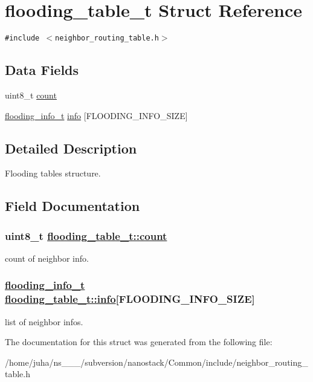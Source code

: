 \hypertarget{structflooding__table__t}{
\section{flooding\_\-table\_\-t Struct Reference}
\label{structflooding__table__t}
}
{\tt \#include $<$neighbor\_\-routing\_\-table.h$>$}

\subsection*{Data Fields}
\begin{CompactItemize}
\item 
uint8\_\-t \hyperlink{structflooding__table__t_cb13efcc138f8c2ec9bfc7f79e404ec1}{count}
\item 
\hyperlink{structflooding__info__t}{flooding\_\-info\_\-t} \hyperlink{structflooding__table__t_19b31cdd8cfa635644fefbfc84881f91}{info} \mbox{[}FLOODING\_\-INFO\_\-SIZE\mbox{]}
\end{CompactItemize}


\subsection{Detailed Description}
Flooding tables structure. 



\subsection{Field Documentation}
\hypertarget{structflooding__table__t_cb13efcc138f8c2ec9bfc7f79e404ec1}{
\subsubsection[count]{\setlength{\rightskip}{0pt plus 5cm}uint8\_\-t \hyperlink{structflooding__table__t_cb13efcc138f8c2ec9bfc7f79e404ec1}{flooding\_\-table\_\-t::count}}}
\label{structflooding__table__t_cb13efcc138f8c2ec9bfc7f79e404ec1}


count of neighbor info. \hypertarget{structflooding__table__t_19b31cdd8cfa635644fefbfc84881f91}{
\subsubsection[info]{\setlength{\rightskip}{0pt plus 5cm}\hyperlink{structflooding__info__t}{flooding\_\-info\_\-t} \hyperlink{structflooding__table__t_19b31cdd8cfa635644fefbfc84881f91}{flooding\_\-table\_\-t::info}\mbox{[}FLOODING\_\-INFO\_\-SIZE\mbox{]}}}
\label{structflooding__table__t_19b31cdd8cfa635644fefbfc84881f91}


list of neighbor infos. 

The documentation for this struct was generated from the following file:\begin{CompactItemize}
\item 
/home/juha/ns\_\_\_/subversion/nanostack/Common/include/neighbor\_\-routing\_\-table.h\end{CompactItemize}
